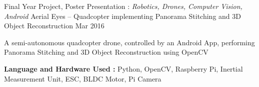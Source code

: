\begin{cventries}
  \cventry
    {Final Year Project, Poster Presentation : \textit{Robotics, Drones, Computer Vision, Android}} %
    {Aerial Eyes – Quadcopter implementing Panorama Stitching and 3D Object Reconstruction} %
    {} %
    {Mar 2016} %
    {
      \begin{cvitems}
      \item{A semi-autonomous quadcopter drone, controlled by an Android App, performing Panorama Stitching and 3D Object Reconstruction using OpenCV}
      \item{\textbf{Language and Hardware Used :} Python, OpenCV, Raspberry Pi, Inertial Measurement Unit, ESC, BLDC Motor, Pi Camera}
      \end{cvitems}
    }




\end{cventries}
